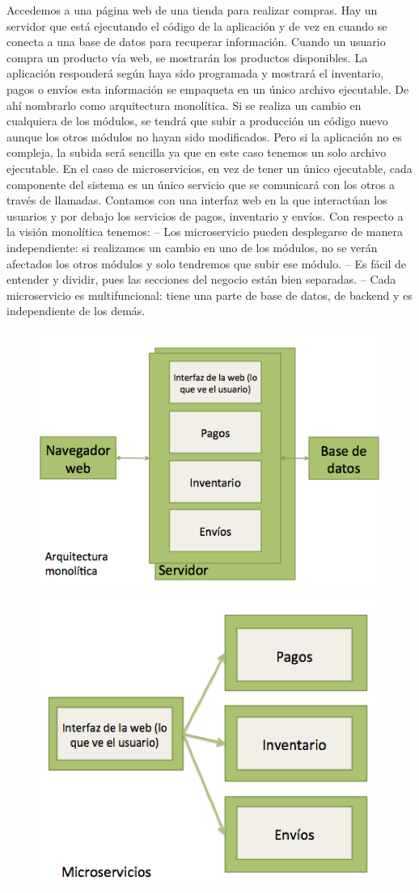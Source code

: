 \documentclass[12pt]{report} %
\begin{document}
Accedemos a una página web de una tienda para realizar compras. Hay un servidor que está ejecutando el código de la aplicación y de vez en cuando se conecta a una base de datos para recuperar información.
Cuando un usuario compra un producto vía web, se mostrarán los productos disponibles. La aplicación responderá según haya sido programada y mostrará el inventario, pagos o envíos esta información se empaqueta en un único archivo ejecutable. De ahí nombrarlo como arquitectura monolítica.
Si se realiza un cambio en cualquiera de los módulos, se tendrá que subir a producción un código nuevo aunque los otros módulos no hayan sido modificados. 
Pero si la aplicación no es compleja, la subida será sencilla ya que en este caso tenemos un solo archivo ejecutable.
En el caso de microservicios, en vez de tener un único ejecutable, cada componente del sistema es un único servicio que se comunicará con los otros a través de llamadas.
Contamos con una interfaz web en la que interactúan los usuarios y por debajo los servicios de pagos, inventario y envíos.
Con respecto a la visión monolítica tenemos:
– Los microservicio pueden desplegarse de manera independiente: si realizamos un cambio en uno de los módulos, no se verán afectados los otros módulos y solo tendremos que subir ese módulo.
– Es fácil de entender y dividir, pues las secciones del negocio están bien separadas.
– Cada microservicio es multifuncional: tiene una parte de base de datos, de backend y es independiente de los demás. 
\begin{figure}
	\centering
	\includegraphics[width=0.7\linewidth]{imagenes/monolithic}
	\caption{}
	\label{fig:monolithic}
\end{figure}
\begin{figure}
	\centering
	\includegraphics[width=0.7\linewidth]{imagenes/microservices}
	\caption{}
	\label{fig:microservicesGrafic}
\end{figure}
\end{document}
